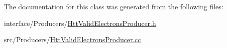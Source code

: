 The documentation for this class was generated from the following files:\begin{DoxyCompactItemize}
\item 
interface/Producers/\hyperlink{HttValidElectronsProducer_8h}{HttValidElectronsProducer.h}\item 
src/Producers/\hyperlink{HttValidElectronsProducer_8cc}{HttValidElectronsProducer.cc}\end{DoxyCompactItemize}
